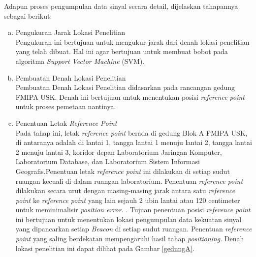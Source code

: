 \par Adapun proses pengumpulan data sinyal secara detail, dijelaskan tahapannya sebagai berikut:
\begin{enumerate}[a.]
	\itemsep0em
	\item Pengukuran Jarak Lokasi Penelitian
	      \\
	      Pengukuran ini bertujuan untuk mengukur jarak dari denah lokasi penelitian yang telah dibuat. Hal ini agar bertujuan untuk membuat bobot pada algoritma \textit{Support Vector Machine} (SVM).
	\item Pembuatan Denah Lokasi Penelitian
	      \\
	      Pembuatan Denah Lokasi Penelitian didasarkan pada rancangan gedung FMIPA USK. Denah ini bertujuan untuk menentukan posisi \textit{reference point} untuk proses pemetaan nantinya.
	\item Penentuan Letak \textit{Reference Point}
	      \\
	      Pada tahap ini, letak \textit{reference point} berada di gedung Blok A FMIPA USK, di antaranya adalah di lantai 1, tangga lantai 1 menuju lantai 2, tangga lantai 2 menuju lantai 3, koridor depan Laboratorium Jaringan Komputer, Laboratorium Database, dan Laboratorium Sistem Informasi Geografis.Penentuan letak \textit{reference point} ini dilakukan di setiap sudut ruangan kecuali di dalam ruangan laboratorium. Penentuan \textit{reference point} dilakukan secara urut dengan masing-masing jarak antara satu \textit{reference point} ke \textit{reference point} yang lain sejauh 2 ubin lantai atau 120 centimeter untuk meminimalisir \textit{position error}. \citep{Lee2019} \citep{Bahl2000}. Tujuan penentuan posisi \textit{reference point} ini bertujuan untuk menentukan lokasi pengumpulan data kekuatan sinyal yang dipancarkan setiap \textit{Beacon} di setiap sudut ruangan. Penentuan \textit{reference point} yang saling berdekatan mempengaruhi hasil tahap \textit{positioning}. Denah lokasi penelitian ini dapat dilihat pada Gambar \ref{gedungA}.


\end{enumerate}
